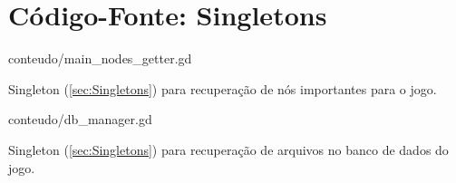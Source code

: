 
\chapter{Código-Fonte: Singletons}
\label{ap:codigo}

\begin{program}
    
    {conteudo/main_nodes_getter.gd}
    \caption{Singleton (\ref{sec:Singletons}) para recuperação de nós importantes para o jogo.}
\end{program}

\begin{program}
    
    {conteudo/db_manager.gd}
    \caption{Singleton (\ref{sec:Singletons}) para recuperação de arquivos no banco de dados do jogo.}
\end{program}
